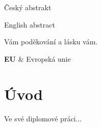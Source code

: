 \documentclass[FM,DP]{tulthesis}
\begin{document}
\begin{abstractCZ}
Český abstrakt
\end{abstractCZ}
\vspace{2cm}
\begin{abstractEN}
English abstract
\end{abstractEN}
\begin{acknowledgement}
Vám poděkování a lásku vám.
\end{acknowledgement}
\tableofcontents
\clearpage
\begin{abbrList}
\textbf{EU} & Evropská unie \\
\end{abbrList}
\chapter{Úvod}
Ve své diplomové práci...
\end{document}
